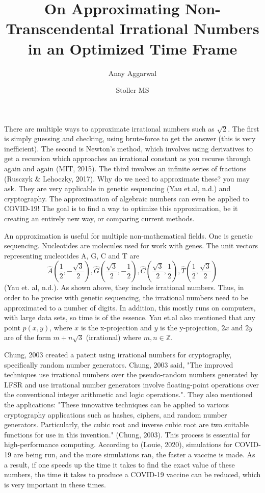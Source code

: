 \documentclass{article}
\title{On Approximating Non-Transcendental Irrational Numbers in an Optimized Time Frame}
\author{
Anay Aggarwal}
\date{Stoller MS}
\begin{document}
\maketitle
\thispagestyle{fancy}
\newpage 
There are multiple ways to approximate irrational numbers such as $\sqrt2$. The first is simply guessing and checking, using brute-force to get the answer (this is very inefficient). The second is Newton's method, which involves using derivatives to get a recursion which approaches an irrational constant as you recurse through again and again (MIT, 2015). The third involves an infinite series of fractions (Rusczyk \& Lehoczky, 2017). Why do we need to approximate these? you may ask. They are very applicable in genetic sequencing (Yau et.al, n.d.) and cryptography. The approximation of algebraic numbers can even be applied to COVID-19! The goal is to find a way to optimize this approximation, be it creating an entirely new way, or comparing current methods.
\par An approximation is useful for multiple non-mathematical fields. One is genetic sequencing. Nucleotides are molecules used for work with genes. The unit vectors representing nucleotides A, G, C and T are $$\hat{A}\left(\frac{1}{2},-\frac{\sqrt3}{2}\right),\hat{G}\left(\frac{\sqrt3}{2},-\frac{1}{2}\right), \hat{C}\left(\frac{\sqrt3}{2},\frac{1}{2}\right),\hat{T}\left(\frac{1}{2},\frac{\sqrt3}{2}\right)$$
(Yau et. al, n.d.). As shown above, they include irrational numbers. Thus, in order to be precise with genetic sequencing, the irrational numbers need to be approximated to a number of digits. In addition, this mostly runs on computers, with large data sets, so time is of the essence. Yau et.al also mentioned that any point $p(x,y)$, where $x$ is the x-projection and $y$ is the y-projection, $2x$ and $2y$ are of the form $m+n\sqrt{3}$ (irrational) where $m,n\in\mathbb{Z}$.
\par Chung, 2003 created a patent using irrational numbers for cryptography, specifically random number generators. Chung, 2003 said, "The improved techniques use irrational numbers over the pseudo-random numbers generated by LFSR and use irrational number generators involve floating-point operations over the conventional integer arithmetic and logic operations.". They also mentioned the applications: "These innovative techniques can be applied to various cryptography applications such as hashes, ciphers, and random number generators. Particularly, the cubic root and inverse cubic root are two suitable functions for use in this invention." (Chung, 2003). This process is essential for high-performance computing. According to (Louie, 2020), simulations for COVID-19 are being run, and the more simulations ran, the faster a vaccine is made. As a result, if one speeds up the time it takes to find the exact value of these numbers, the time it takes to produce a COVID-19 vaccine can be reduced, which is very important in these times.
\end{document}
